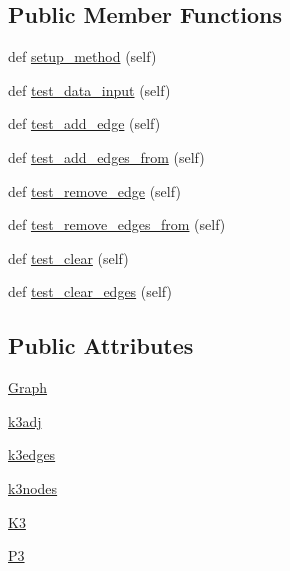 \subsection*{Public Member Functions}
\begin{DoxyCompactItemize}
\item 
def \hyperlink{classnetworkx_1_1classes_1_1tests_1_1test__digraph_1_1TestDiGraph_aeba91cf020125915d5e8bfaf51178f46}{setup\+\_\+method} (self)
\item 
def \hyperlink{classnetworkx_1_1classes_1_1tests_1_1test__digraph_1_1TestDiGraph_a6b47ad7f3818dac666f6914adf2238e9}{test\+\_\+data\+\_\+input} (self)
\item 
def \hyperlink{classnetworkx_1_1classes_1_1tests_1_1test__digraph_1_1TestDiGraph_a0610c146a79e4de9ee8cb59a159b6a5d}{test\+\_\+add\+\_\+edge} (self)
\item 
def \hyperlink{classnetworkx_1_1classes_1_1tests_1_1test__digraph_1_1TestDiGraph_a730f647a7fdcfd4ed936085b322638c3}{test\+\_\+add\+\_\+edges\+\_\+from} (self)
\item 
def \hyperlink{classnetworkx_1_1classes_1_1tests_1_1test__digraph_1_1TestDiGraph_a304a74f81ad973a237c22190a6d0ac1e}{test\+\_\+remove\+\_\+edge} (self)
\item 
def \hyperlink{classnetworkx_1_1classes_1_1tests_1_1test__digraph_1_1TestDiGraph_a7904902aa03f2a4fed1e2378aee79e93}{test\+\_\+remove\+\_\+edges\+\_\+from} (self)
\item 
def \hyperlink{classnetworkx_1_1classes_1_1tests_1_1test__digraph_1_1TestDiGraph_ac5e48b1c1acc6f60bfb8fa257dcb88c3}{test\+\_\+clear} (self)
\item 
def \hyperlink{classnetworkx_1_1classes_1_1tests_1_1test__digraph_1_1TestDiGraph_a4bcf7a24f92eba60ec6aac3603d0bf80}{test\+\_\+clear\+\_\+edges} (self)
\end{DoxyCompactItemize}
\subsection*{Public Attributes}
\begin{DoxyCompactItemize}
\item 
\hyperlink{classnetworkx_1_1classes_1_1tests_1_1test__digraph_1_1TestDiGraph_adad58ec893d99a48d9b3cacbdec4e31d}{Graph}
\item 
\hyperlink{classnetworkx_1_1classes_1_1tests_1_1test__digraph_1_1TestDiGraph_afc058ce7e78c2902843329205ce26de5}{k3adj}
\item 
\hyperlink{classnetworkx_1_1classes_1_1tests_1_1test__digraph_1_1TestDiGraph_a8f9dfd6084e0ccd20a95e0c9602affe6}{k3edges}
\item 
\hyperlink{classnetworkx_1_1classes_1_1tests_1_1test__digraph_1_1TestDiGraph_ac5444d8568d1bc456720499cc1536219}{k3nodes}
\item 
\hyperlink{classnetworkx_1_1classes_1_1tests_1_1test__digraph_1_1TestDiGraph_aa127137ba579cea91e15eac0db9ebf00}{K3}
\item 
\hyperlink{classnetworkx_1_1classes_1_1tests_1_1test__digraph_1_1TestDiGraph_abf9c3bc9c8029d2e977e93bf8d03e503}{P3}
\end{DoxyCompactItemize}
